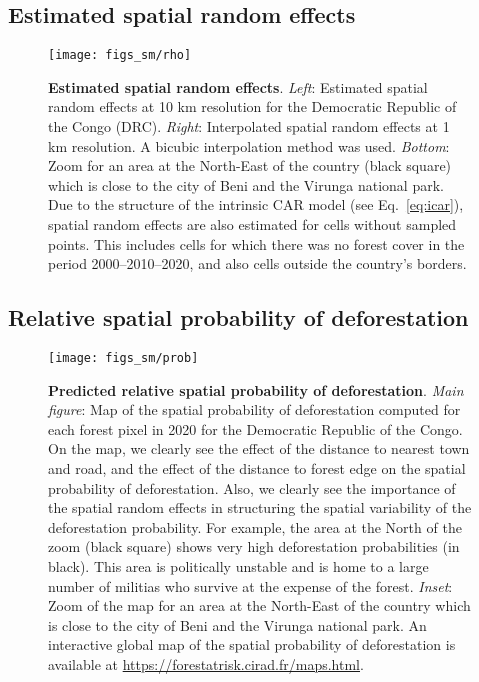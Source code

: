\documentclass[
  12pt,
]{article}
\begin{document}
\hypertarget{estimated-spatial-random-effects}{%
\subsection{Estimated spatial random effects}\label{estimated-spatial-random-effects}}



\begin{figure}[H]

{\centering \texttt{[image: figs\_sm/rho]} 

}

\caption{\textbf{Estimated spatial random effects}. \emph{Left}: Estimated spatial random effects at 10 km resolution for the Democratic Republic of the Congo (DRC). \emph{Right}: Interpolated spatial random effects at 1 km resolution. A bicubic interpolation method was used. \emph{Bottom}: Zoom for an area at the North-East of the country (black square) which is close to the city of Beni and the Virunga national park. Due to the structure of the intrinsic CAR model (see Eq.~\eqref{eq:icar}), spatial random effects are also estimated for cells without sampled points. This includes cells for which there was no forest cover in the period 2000--2010--2020, and also cells outside the country's borders.}\label{fig:rho}
\end{figure}

\hypertarget{relative-spatial-probability-of-deforestation}{%
\subsection{Relative spatial probability of deforestation}\label{relative-spatial-probability-of-deforestation}}



\begin{figure}[H]

{\centering \texttt{[image: figs\_sm/prob]} 

}

\caption{\textbf{Predicted relative spatial probability of deforestation}. \emph{Main figure}: Map of the spatial probability of deforestation computed for each forest pixel in 2020 for the Democratic Republic of the Congo. On the map, we clearly see the effect of the distance to nearest town and road, and the effect of the distance to forest edge on the spatial probability of deforestation. Also, we clearly see the importance of the spatial random effects in structuring the spatial variability of the deforestation probability. For example, the area at the North of the zoom (black square) shows very high deforestation probabilities (in black). This area is politically unstable and is home to a large number of militias who survive at the expense of the forest. \emph{Inset}: Zoom of the map for an area at the North-East of the country which is close to the city of Beni and the Virunga national park. An interactive global map of the spatial probability of deforestation is available at \url{https://forestatrisk.cirad.fr/maps.html}.}\label{fig:sm-prob}
\end{figure}
\end{document}
